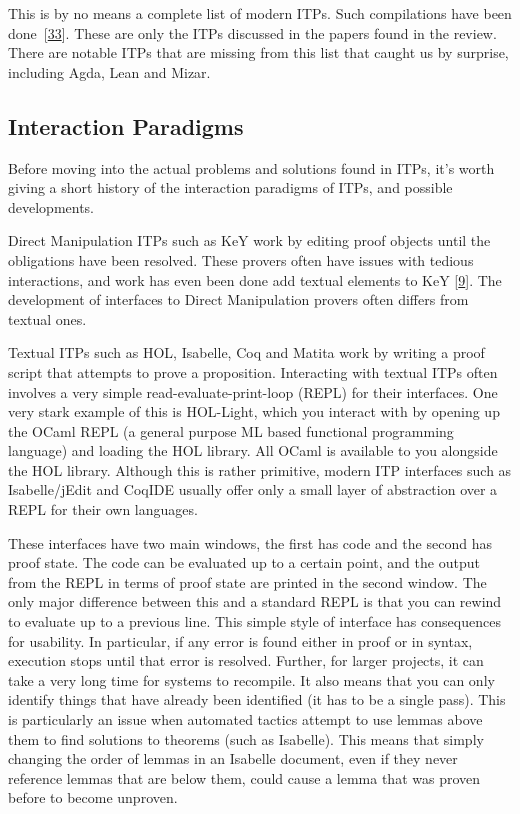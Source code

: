 \documentclass[
]{article}
\begin{document}
This is by no means a complete list of modern ITPs. Such compilations
have been done~{[}\protect\hyperlink{ref-nawaz_survey_2019}{33}{]}.
These are only the ITPs discussed in the papers found in the review.
There are notable ITPs that are missing from this list that caught us by
surprise, including Agda, Lean and Mizar.

\hypertarget{interaction-paradigms}{%
\subsection{Interaction Paradigms}\label{interaction-paradigms}}

Before moving into the actual problems and solutions found in ITPs, it's
worth giving a short history of the interaction paradigms of ITPs, and
possible developments.

Direct Manipulation ITPs such as KeY work by editing proof objects until
the obligations have been resolved. These provers often have issues with
tedious interactions, and work has even been done add textual elements
to KeY {[}\protect\hyperlink{ref-beckert_interaction_2017}{9}{]}. The
development of interfaces to Direct Manipulation provers often differs
from textual ones.

Textual ITPs such as HOL, Isabelle, Coq and Matita work by writing a
proof script that attempts to prove a proposition. Interacting with
textual ITPs often involves a very simple read-evaluate-print-loop
(REPL) for their interfaces. One very stark example of this is
HOL-Light, which you interact with by opening up the OCaml REPL (a
general purpose ML based functional programming language) and loading
the HOL library. All OCaml is available to you alongside the HOL
library. Although this is rather primitive, modern ITP interfaces such
as Isabelle/jEdit and CoqIDE usually offer only a small layer of
abstraction over a REPL for their own languages.

These interfaces have two main windows, the first has code and the
second has proof state. The code can be evaluated up to a certain point,
and the output from the REPL in terms of proof state are printed in the
second window. The only major difference between this and a standard
REPL is that you can rewind to evaluate up to a previous line. This
simple style of interface has consequences for usability. In particular,
if any error is found either in proof or in syntax, execution stops
until that error is resolved. Further, for larger projects, it can take
a very long time for systems to recompile. It also means that you can
only identify things that have already been identified (it has to be a
single pass). This is particularly an issue when automated tactics
attempt to use lemmas above them to find solutions to theorems (such as
Isabelle). This means that simply changing the order of lemmas in an
Isabelle document, even if they never reference lemmas that are below
them, could cause a lemma that was proven before to become unproven.
\end{document}
